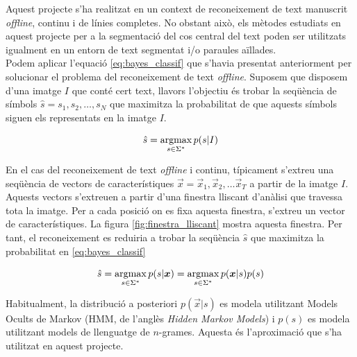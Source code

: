 Aquest projecte s'ha realitzat en un context de reconeixement de text manuscrit \emph{offline}, continu i de línies completes. No obstant això, els mètodes estudiats en aquest projecte per a la segmentació del cos central del text poden ser utilitzats igualment en un entorn de text segmentat i/o paraules aïllades.\\

Podem aplicar l'equació \ref{eq:bayes_classif} que s'havia presentat anteriorment per solucionar el problema del reconeixement de text \emph{offline}. Suposem que disposem d'una imatge $I$ que conté cert text, llavors l'objectiu és trobar la seqüència de símbols $\hat{s} = s_1, s_2, \ldots, s_N$ que maximitza la probabilitat de que aquests símbols siguen els representats en la imatge $I$.

\begin{equation}\label{eq:}
\hat{s} = \operatorname*{argmax}_{s \in \Sigma^*} p(s|I)
\end{equation}

En el cas del reconeixement de text \emph{offline} i continu, típicament s'extreu una seqüència de vectors de característiques $\vec{x} = \vec{x}_1, \vec{x}_2, \ldots \vec{x}_T$ a partir de la imatge $I$. Aquests vectors s'extreuen a partir d'una finestra lliscant d'anàlisi que travessa tota la imatge. Per a cada posició on es fixa aquesta finestra, s'extreu un vector de característiques. La figura \ref{fig:finestra_lliscant} mostra aquesta finestra. Per tant, el reconeixement es reduiria a trobar la seqüència $\hat{s}$ que maximitza la probabilitat en  \ref{eq:bayes_classif}

\begin{equation}\label{eq:bayes_classif_vectors}
\hat{s} = \argmax_{s \in \Sigma^*} p(s|\vec{x}) = \argmax_{s \in \Sigma^*} p(\vec{x}|s) p(s) %
\end{equation}

Habitualment, la distribució a posteriori $p(\vec{x}|s)$ es modela utilitzant Models Ocults de Markov (HMM, de l'anglès \emph{Hidden Markov Models}) i $p(s)$ es modela utilitzant models de llenguatge de $n$-grames. Aquesta és l'aproximació que s'ha utilitzat en aquest projecte.